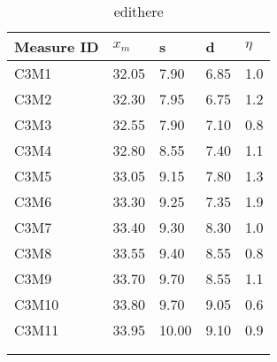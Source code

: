 \begin{longtable}{@{}lllll@{}}
\toprule
Measure ID & $x_m$ & s & d & $\eta$ \tabularnewline
\midrule
C3M1 & 32.05 & 7.90 & 6.85 & 1.0 \tabularnewline
C3M2 & 32.30 & 7.95 & 6.75 & 1.2 \tabularnewline
C3M3 & 32.55 & 7.90 & 7.10 & 0.8 \tabularnewline
C3M4 & 32.80 & 8.55 & 7.40 & 1.1 \tabularnewline
C3M5 & 33.05 & 9.15 & 7.80 & 1.3 \tabularnewline
C3M6 & 33.30 & 9.25 & 7.35 & 1.9 \tabularnewline
C3M7 & 33.40 & 9.30 & 8.30 & 1.0 \tabularnewline
C3M8 & 33.55 & 9.40 & 8.55 & 0.8 \tabularnewline
C3M9 & 33.70 & 9.70 & 8.55 & 1.1 \tabularnewline
C3M10 & 33.80 & 9.70 & 9.05 & 0.6 \tabularnewline
C3M11 & 33.95 & 10.00 & 9.10 & 0.9 \tabularnewline
\bottomrule
\label{tab:edithere}
\\
\caption{edithere}
\end{longtable}
